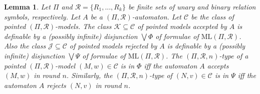 \documentclass[copyright,creativecommons]{eptcs}
\newtheorem{lemma}[theorem]{Lemma}
\begin{document}
\begin{lemma}\label{firstlemma}
Let $\Pi$ and $\mathcal{R} = \{R_1,...,R_k\}$ be finite sets of unary and binary relation symbols,
respectively. Let $A$ be a $(\Pi,\mathcal{R})$-automaton.
Let $\mathcal{C}$ be the class of pointed $(\Pi,\mathcal{R})$-models.
The class $\mathcal{K}\subseteq\mathcal{C}$ of pointed models accepted by $A$ is definable
by a (possibly infinite)
disjunction $\bigvee\Phi$ of formulae of $\mathrm{ML}(\Pi,\mathcal{R})$. Also the 
class $\mathcal{J}\subseteq\mathcal{C}$ of pointed models rejected by $A$ is definable
by a (possibly infinite)
disjunction $\bigvee\Psi$ of formulae of $\mathrm{ML}(\Pi,\mathcal{R})$.
The $(\Pi,\mathcal{R},n)$-type of a pointed $(\Pi,\mathcal{R})$-model $(M,w)\in\mathcal{C}$ is in $\Phi$ iff
the automaton $A$ accepts $(M,w)$ in round $n$. Similarly, the $(\Pi,\mathcal{R},n)$-type of $(N,v)\in\mathcal{C}$
is in $\Psi$ iff the automaton $A$ rejects $(N,v)$ in round $n$.
\begin{comment}
If $A$ specifies a local algorithm in some class $\mathcal{H}\subseteq\mathcal{C}$ and
$\mathcal{M}\subseteq\mathcal{H}$  is the class of pointed models accepted by $A$ in $\mathcal{H}$,
then there is a formula of $\mathrm{ML}(\Pi,\mathcal{R})$ that defines $\mathcal{M}$
with respect to $\mathcal{H}$.
\end{comment}
\end{lemma}
\end{document}
